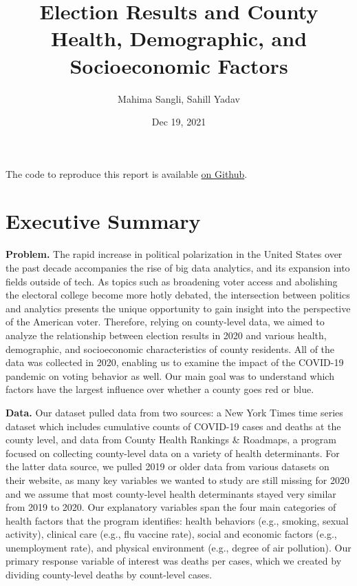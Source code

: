 \documentclass[
]{article}
\title{Election Results and County Health, Demographic, and Socioeconomic Factors}
\author{Mahima Sangli, Sahill Yadav}
\date{Dec 19, 2021}
\begin{document}
\maketitle

{
\hypersetup{linkcolor=}
\setcounter{tocdepth}{3}
\tableofcontents
}
\bigskip

The code to reproduce this report is available \href{https://github.com/Katsevich-Teaching/final-project-template}{on Github}.

\newpage

\hypertarget{executive-summary}{%
\section{Executive Summary}\label{executive-summary}}

\textbf{Problem.} The rapid increase in political polarization in the United States over the past decade accompanies the rise of big data analytics, and its expansion into fields outside of tech. As topics such as broadening voter access and abolishing the electoral college become more hotly debated, the intersection between politics and analytics presents the unique opportunity to gain insight into the perspective of the American voter. Therefore, relying on county-level data, we aimed to analyze the relationship between election results in 2020 and various health, demographic, and socioeconomic characteristics of county residents. All of the data was collected in 2020, enabling us to examine the impact of the COVID-19 pandemic on voting behavior as well. Our main goal was to understand which factors have the largest influence over whether a county goes red or blue.

\textbf{Data.} Our dataset pulled data from two sources: a New York Times time series dataset which includes cumulative counts of COVID-19 cases and deaths at the county level, and data from County Health Rankings \& Roadmaps, a program focused on collecting county-level data on a variety of health determinants. For the latter data source, we pulled 2019 or older data from various datasets on their website, as many key variables we wanted to study are still missing for 2020 and we assume that most county-level health determinants stayed very similar from 2019 to 2020. Our explanatory variables span the four main categories of health factors that the program identifies: health behaviors (e.g., smoking, sexual activity), clinical care (e.g., flu vaccine rate), social and economic factors (e.g., unemployment rate), and physical environment (e.g., degree of air pollution). Our primary response variable of interest was deaths per cases, which we created by dividing county-level deaths by count-level cases.
\end{document}
